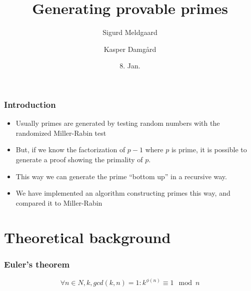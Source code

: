 \documentclass{beamer}
\title{Generating provable primes}
\author{Sigurd Meldgaard \and Kasper Damgård}
\date{8. Jan.}
\begin{document}
\maketitle

\begin{frame}
  \frametitle{Introduction} 

  \begin{itemize}
  \item Usually primes are generated by testing random numbers with
    the randomized Miller-Rabin test \pause
\item But, if we know the factorization
    of $p-1$ where $p$ is prime, it is possible to generate a
    proof showing the primality of $p$.  
\pause 
\item This way we
    can generate the prime ``bottom up'' in a recursive way.
    \pause
  \item We have implemented an algorithm constructing primes this way,
    and compared it to Miller-Rabin
  \end{itemize}
\end{frame}

\section{Theoretical background}
\begin{frame}
\frametitle{Euler's theorem}
\[
\forall n\in N, k, gcd(k,n)=1: k^{\phi(n)} \equiv 1 \mod n
\]
\end{frame}
\end{document}
